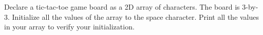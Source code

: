 \begin{ex}
Declare a tic-tac-toe game board as a 2D array of
characters. The board is 3-by-3. Initialize all the values of the array
to the space character. Print all the values in your array to verify
your initialization.
\end{ex}
